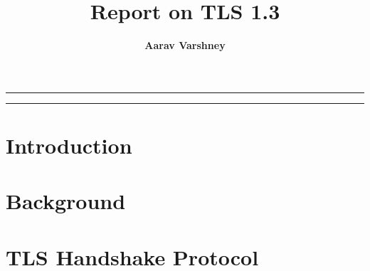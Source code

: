 \documentclass{article}
\author[1]{\textbf{Aarav Varshney}}
\affil[1]{\textbf{Ashoka University}, \texttt{aarav.varshney@alumni.ashoka.edu.in}}
\title{\textbf{\huge Report on TLS 1.3}\\}
\date{}
\begin{document}
\pagestyle{headings}	
\newpage
\setcounter{page}{1}
\renewcommand{\thepage}{\arabic{page}}

\setlength{\parskip}{0.5em}
	
\maketitle
	
\noindent\rule{15cm}{0.5pt}
	\begin{abstract}
        
	\end{abstract}
\noindent\rule{15cm}{0.4pt}

\section{Introduction}


\section{Background}


\section{TLS Handshake Protocol}

% 
% 

\newpage


\end{document}

